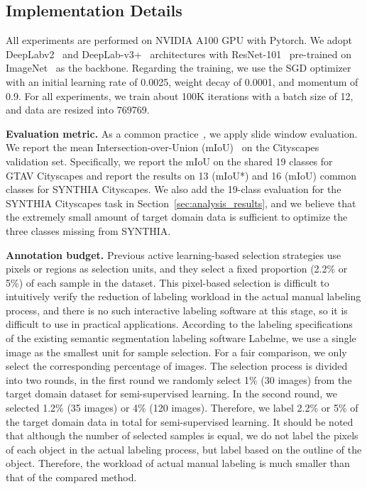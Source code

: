 \documentclass[journal]{IEEEtran}
\newcommand{\Sref}[1]{Section~\ref{#1}}
\renewcommand{\paragraph}[1]{\vspace{1.25mm}\noindent\textbf{#1}}
\newcommand{\ssl}{semi-supervised learning\xspace}
\begin{document}
\subsection{Implementation Details}
All experiments are performed on NVIDIA A100 GPU with Pytorch. We adopt DeepLabv2~\cite{chen2017deeplab} and DeepLab-v3+~\cite{chen2018encoder} architectures with ResNet-101~\cite{he2016deep} pre-trained on ImageNet~\cite{deng2009imagenet} as the backbone. Regarding the training, we use the SGD optimizer with an initial learning rate of 0.0025, weight decay of 0.0001, and momentum of 0.9. For all experiments, we train about 100K iterations with a batch size of 12, and data are resized into 769769.

\paragraph{Evaluation metric.} As a common practice~\cite{mei2020instance, ning2021multi, shin2021labor, xie2022towards}, we apply slide window evaluation. We report the mean Intersection-over-Union (mIoU)~\cite{everingham2015pascal} on the Cityscapes validation set. Specifically, we report the mIoU on the shared 19 classes for GTAV  Cityscapes and report the results on 13 (mIoU*) and 16 (mIoU) common classes for SYNTHIA  Cityscapes. We also add the 19-class evaluation for the SYNTHIA  Cityscapes task in \Sref{sec:analysis_results}, and we believe that the extremely small amount of target domain data is sufficient to optimize the three classes missing from SYNTHIA.

\paragraph{Annotation budget.} Previous active learning-based selection strategies use pixels or regions as selection units, and they select a fixed proportion (2.2\% or 5\%) of each sample in the dataset. This pixel-based selection is difficult to intuitively verify the reduction of labeling workload in the actual manual labeling process, and there is no such interactive labeling software at this stage, so it is difficult to use in practical applications. According to the labeling specifications of the existing semantic segmentation labeling software Labelme, we use a single image as the smallest unit for sample selection. For a fair comparison, we only select the corresponding percentage of images. The selection process is divided into two rounds, in the first round we randomly select 1\% (30 images) from the target domain dataset for \ssl. In the second round, we selected 1.2\% (35 images) or 4\% (120 images). Therefore, we label 2.2\% or 5\% of the target domain data in total for \ssl. It should be noted that although the number of selected samples is equal, we do not label the pixels of each object in the actual labeling process, but label based on the outline of the object. Therefore, the workload of actual manual labeling is much smaller than that of the compared method.
\end{document}

